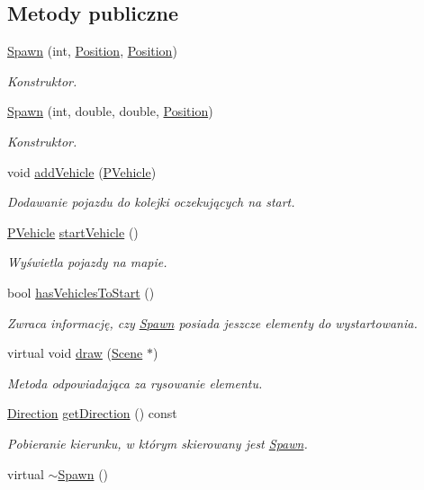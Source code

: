 \subsection*{Metody publiczne}
\begin{DoxyCompactItemize}
\item 
\hyperlink{class_spawn_a972290baedf94f776541be6039ee7d75}{Spawn} (int, \hyperlink{struct_position}{Position}, \hyperlink{struct_position}{Position})
\begin{DoxyCompactList}\small\item\em Konstruktor. \end{DoxyCompactList}\item 
\hyperlink{class_spawn_a54ab1e49c79ee947204f920046164829}{Spawn} (int, double, double, \hyperlink{struct_position}{Position})
\begin{DoxyCompactList}\small\item\em Konstruktor. \end{DoxyCompactList}\item 
void \hyperlink{class_spawn_afce802a99344be2869d5723f930cb3f4}{add\-Vehicle} (\hyperlink{_types_8h_a564207d327881e8bcfa0843e1a874756}{P\-Vehicle})
\begin{DoxyCompactList}\small\item\em Dodawanie pojazdu do kolejki oczekujących na start. \end{DoxyCompactList}\item 
\hyperlink{_types_8h_a564207d327881e8bcfa0843e1a874756}{P\-Vehicle} \hyperlink{class_spawn_af9f3e004e311973f4c8983aa586869f4}{start\-Vehicle} ()
\begin{DoxyCompactList}\small\item\em Wyświetla pojazdy na mapie. \end{DoxyCompactList}\item 
bool \hyperlink{class_spawn_a343f21c11732fad395e1b9f5bf1a227e}{has\-Vehicles\-To\-Start} ()
\begin{DoxyCompactList}\small\item\em Zwraca informację, czy \hyperlink{class_spawn}{Spawn} posiada jeszcze elementy do wystartowania. \end{DoxyCompactList}\item 
virtual void \hyperlink{class_spawn_a725ac9cb33aff1b26b19ed3affecf692}{draw} (\hyperlink{class_scene}{Scene} $\ast$)
\begin{DoxyCompactList}\small\item\em Metoda odpowiadająca za rysowanie elementu. \end{DoxyCompactList}\item 
\hyperlink{_direction_8h_a224b9163917ac32fc95a60d8c1eec3aa}{Direction} \hyperlink{class_spawn_a4a8907eb45fc0a0168d75063b51456a1}{get\-Direction} () const 
\begin{DoxyCompactList}\small\item\em Pobieranie kierunku, w którym skierowany jest \hyperlink{class_spawn}{Spawn}. \end{DoxyCompactList}\item 
virtual \hyperlink{class_spawn_aea08036b23acdb06fd47eba35dc2a8cf}{$\sim$\-Spawn} ()
\end{DoxyCompactItemize}

